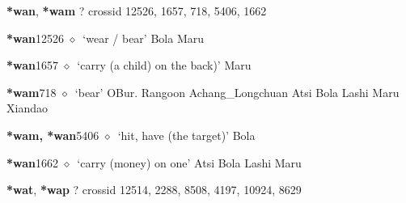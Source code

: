 \item
\textbf{*wan}, \textbf{*wam}
?
  {\tiny crossid 12526, 1657, 718, 5406, 1662}
  \begin{list}{}{\leftmargin=1.5em \itemindent=-1.5em}
  \item {\footnotesize \textbf{*wan}}{\tiny 12526}
         $\diamond$~`wear / bear'
         Bola 
\hspace{1ex}
         Maru 
  \item {\footnotesize \textbf{*wan}}{\tiny 1657}
\hspace{1ex}
         $\diamond$~`carry (a child) on the back)'
         Maru 
  \item {\footnotesize \textbf{*wam}}{\tiny 718}
\hspace{1ex}
         $\diamond$~`bear'
         OBur. 
\hspace{1ex}
         Rangoon 
\hspace{1ex}
         Achang\_Longchuan 
\hspace{1ex}
         Atsi 
\hspace{1ex}
         Bola 
\hspace{1ex}
         Lashi 
\hspace{1ex}
         Maru 
\hspace{1ex}
         Xiandao 
  \item {\footnotesize \textbf{*wam, *wan}}{\tiny 5406}
\hspace{1ex}
         $\diamond$~`hit, have (the target)'
         Bola 
  \item {\footnotesize \textbf{*wan}}{\tiny 1662}
\hspace{1ex}
         $\diamond$~`carry (money) on one'
         Atsi 
\hspace{1ex}
         Bola 
\hspace{1ex}
         Lashi 
\hspace{1ex}
         Maru 
  \end{list}
\item
\textbf{*wat}, \textbf{*wap}
?
  {\tiny crossid 12514, 2288, 8508, 4197, 10924, 8629}
